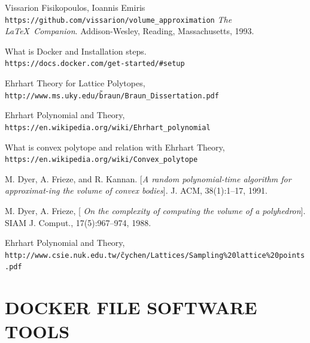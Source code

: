 \documentclass[12pt,twoside]{article}
\begin{document}
\begin{thebibliography}{9}
Vissarion Fisikopoulos, Ioannis Emiris 
\\\texttt{https://github.com/vissarion/volume\_approximation}
\textit{The \LaTeX\ Companion}. 
Addison-Wesley, Reading, Massachusetts, 1993.
 
What is Docker and Installation steps. 
\\\texttt{https://docs.docker.com/get-started/\#setup}

Ehrhart Theory for Lattice Polytopes,
\\\texttt{http://www.ms.uky.edu/\~braun/Braun\_Dissertation.pdf}

Ehrhart Polynomial and Theory,
\\\texttt{https://en.wikipedia.org/wiki/Ehrhart\_polynomial}

What is convex polytope and relation with Ehrhart Theory,
\\\texttt{https://en.wikipedia.org/wiki/Convex\_polytope}

M. Dyer, A. Frieze, and R. Kannan.
[\textit{A random polynomial-time algorithm for
approximat-ing the volume of convex bodies}].
 J. ACM, 38(1):1–17, 1991.



M. Dyer, A. Frieze,
[\textit{ On the complexity of computing the volume of a
polyhedron}].
SIAM J. Comput., 17(5):967–974, 1988.


Ehrhart Polynomial and Theory,
\\\texttt{http://www.csie.nuk.edu.tw/\~cychen/Lattices/Sampling\%20lattice\%20points.pdf}

\end{thebibliography}





\newpage
\appendix
\section{DOCKER FILE SOFTWARE TOOLS}
\end{document}
